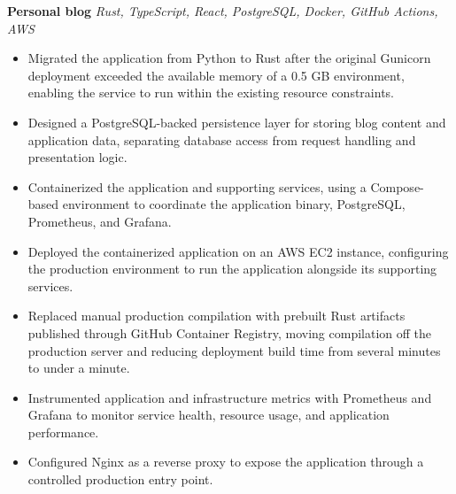 \textbf{Personal blog}
\hfill
\textit{\small Rust, TypeScript, React, PostgreSQL, Docker, GitHub Actions, AWS}

\begin{itemize}
    \item Migrated the application from Python to Rust after the original Gunicorn deployment exceeded the available memory of a 0.5 GB environment, enabling the service to run within the existing resource constraints.

    \item Designed a PostgreSQL-backed persistence layer for storing blog content and application data, separating database access from request handling and presentation logic.

    \item Containerized the application and supporting services, using a Compose-based environment to coordinate the application binary, PostgreSQL, Prometheus, and Grafana.

    \item Deployed the containerized application on an AWS EC2 instance, configuring the production environment to run the application alongside its supporting services.

    \item Replaced manual production compilation with prebuilt Rust artifacts published through GitHub Container Registry, moving compilation off the production server and reducing deployment build time from several minutes to under a minute. 

    \item Instrumented application and infrastructure metrics with Prometheus and Grafana to monitor service health, resource usage, and application performance.
    
    \item Configured Nginx as a reverse proxy to expose the application through a controlled production entry point.
    
\end{itemize}